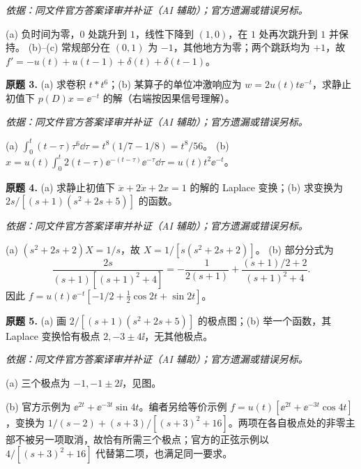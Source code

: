\begin{solution}
\textit{依据：同文件官方答案译审并补证（AI 辅助）；官方遗漏或错误另标。}\par
(a) 负时间为零，$0$ 处跳升到 $1$，线性下降到 $(1,0)$，在 $1$ 处再次跳升到 $1$ 并保持。
(b)--(c) 常规部分在 $(0,1)$ 为 $-1$，其他地方为零；两个跳跃均为 $+1$，故 $f'=-u(t)+u(t-1)+\delta(t)+\delta(t-1)$。\ODEExamPracticeRamp
\end{solution}
\begin{exercise}\label{cw:prex3-3}\textbf{原题 3.}
(a) 求卷积 $t*t^6$；(b) 某算子的单位冲激响应为 $w=2u(t)t\ee^{-t}$，求静止初值下 $p(D)x=\ee^{-t}$ 的解（右端按因果信号理解）。
\end{exercise}
\begin{solution}
\textit{依据：同文件官方答案译审并补证（AI 辅助）；官方遗漏或错误另标。}\par
(a) $\int_0^t(t-\tau)\tau^6\dd\tau=t^8(1/7-1/8)=t^8/56$。
(b) $x=u(t)\int_0^t2(t-\tau)\ee^{-(t-\tau)}\ee^{-\tau}\dd\tau=u(t)t^2\ee^{-t}$。
\end{solution}
\begin{exercise}\label{cw:prex3-4}\textbf{原题 4.}
(a) 求静止初值下 $\ddot x+2\dot x+2x=1$ 的解的 Laplace 变换；(b) 求变换为 $2s/[(s+1)(s^2+2s+5)]$ 的函数。
\end{exercise}
\begin{solution}
\textit{依据：同文件官方答案译审并补证（AI 辅助）；官方遗漏或错误另标。}\par
(a) $(s^2+2s+2)X=1/s$，故 $X=1/[s(s^2+2s+2)]$。
(b) 部分分式为
\[\frac{2s}{(s+1)[(s+1)^2+4]}=-\frac{1}{2(s+1)}+\frac{(s+1)/2+2}{(s+1)^2+4}.\]
因此 $f=u(t)\ee^{-t}[-1/2+\tfrac12\cos2t+\sin2t]$。
\end{solution}
\begin{exercise}\label{cw:prex3-5}\textbf{原题 5.}
(a) 画 $2/[(s+1)(s^2+2s+5)]$ 的极点图；(b) 举一个函数，其 Laplace 变换恰有极点 $2,-3\pm4\ii$，无其他极点。
\end{exercise}
\begin{solution}
\textit{依据：同文件官方答案译审并补证（AI 辅助）；官方遗漏或错误另标。}\par
(a) 三个极点为 $-1,-1\pm2\ii$，见图。
\begin{center}\end{center}
(b) 官方示例为 $\ee^{2t}+\ee^{-3t}\sin4t$。编者另给等价示例 $f=u(t)[\ee^{2t}+\ee^{-3t}\cos4t]$，变换为 $1/(s-2)+(s+3)/[(s+3)^2+16]$。两项在各自极点处的非零主部不被另一项取消，故恰有所需三个极点；官方的正弦示例以 $4/[(s+3)^2+16]$ 代替第二项，也满足同一要求。
\end{solution}

